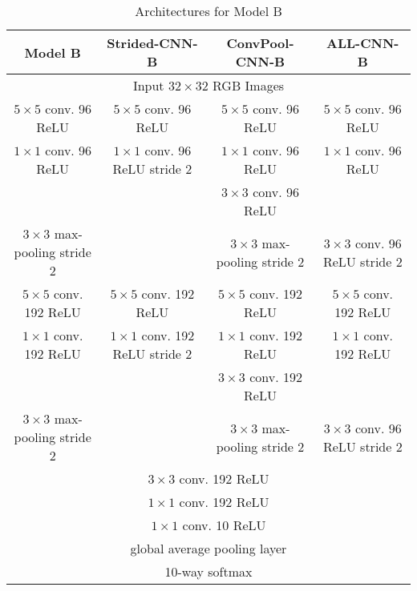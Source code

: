 \begin{table}
  \centering
  \begin{tabular}{|c|c|c|c|}
    \hline
    Model B & Strided-CNN-B & ConvPool-CNN-B & ALL-CNN-B \\
    \hline
    \multicolumn{4}{|c|}{Input $32\times32$ RGB Images} \\
    \hline
    $5\times5$ conv. 96 ReLU & $5\times5$ conv. 96 ReLU &  $5\times5$ conv. 96 ReLU & $5\times5$ conv. 96 ReLU \\
    $1\times1$ conv. 96 ReLU & $1\times1$ conv. 96 ReLU stride 2 &  $1\times1$ conv. 96 ReLU & $1\times1$ conv. 96 ReLU \\
    & & $3\times3$ conv. 96 ReLU & \\
    \hline
    $3\times3$ max-pooling stride 2 & & $3\times3$ max-pooling stride 2& $3\times3$ conv. 96 ReLU stride 2 \\
    \hline
    $5\times5$ conv. 192 ReLU & $5\times5$ conv. 192 ReLU &  $5\times5$ conv. 192 ReLU & $5\times5$ conv. 192 ReLU \\
    $1\times1$ conv. 192 ReLU & $1\times1$ conv. 192 ReLU stride 2 &  $1\times1$ conv. 192 ReLU & $1\times1$ conv. 192 ReLU \\
    & & $3\times3$ conv. 192 ReLU & \\
    \hline
    $3\times3$ max-pooling stride 2 & & $3\times3$ max-pooling stride 2& $3\times3$ conv. 96 ReLU stride 2 \\
    \hline
    \multicolumn{4}{|c|}{$3\times3$ conv. 192 ReLU} \\
    \multicolumn{4}{|c|}{$1\times1$ conv. 192 ReLU} \\
    \multicolumn{4}{|c|}{$1\times1$ conv. 10 ReLU} \\
    \multicolumn{4}{|c|}{global average pooling layer} \\
    \multicolumn{4}{|c|}{10-way softmax} \\
  \end{tabular}
  \caption{Architectures for Model B}
\end{table}

